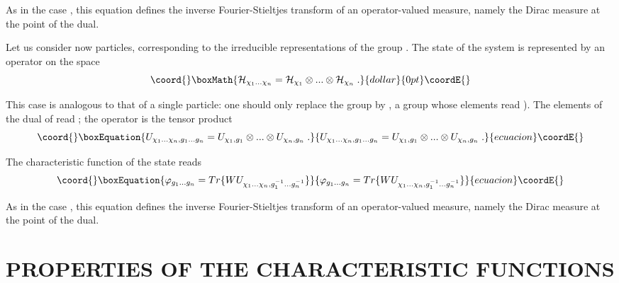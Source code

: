 \documentclass[a4paper,11pt]{article}
\begin{document}
As in the case \coordHE{}, this equation defines the inverse Fourier-Stieltjes transform of an 
operator-valued measure, namely the Dirac measure \coordHE{} at the point \coordHE{} of the dual. 

Let us consider now \coordHE{} particles, corresponding to the irreducible representations 
\coordHE{} 
of the group \coordHE{}. The state of the system is represented by an operator \coordHE{} on the space
$$\coord{}\boxMath{
   \Hc_{\chi_1 ... \chi_n} = \Hc_{\chi_1}\otimes ... \otimes \Hc_{\chi_n} \; .
}{dollar}{0pt}\coordE{}$$ 

This case is analogous to that of a single particle: one should only replace the group \coordHE{} by 
\coordHE{}, 
a group whose elements read \coordHE{}). The elements of the dual of \coordHE{} read 
\coordHE{}; the operator \coordHE{} is the tensor 
product
\begin{equation}\coord{}\boxEquation{
 \label{eq.4.3}
   U_{\chi_1 ... \chi_n,g_1 ... g_n} = U_{\chi_1,g_1} \otimes ... \otimes U_{\chi_n,g_n}  \; .
}{
 U_{\chi_1 ... \chi_n,g_1 ... g_n} = U_{\chi_1,g_1} \otimes ... \otimes U_{\chi_n,g_n}  \; .
}{ecuacion}\coordE{}\end{equation}

The characteristic function of the state \coordHE{} reads
\begin{equation}\coord{}\boxEquation{
 \label{eq.4.4}
    \varphi_{g_1 ... g_n} = Tr \{ W  U_{\chi_1 ... \chi_n,g_1^{-1} ... g_n^{-1}} \}
}{
 \varphi_{g_1 ... g_n} = Tr \{ W  U_{\chi_1 ... \chi_n,g_1^{-1} ... g_n^{-1}} \}
}{ecuacion}\coordE{}\end{equation}

As in the case \coordHE{}, this equation defines the inverse Fourier-Stieltjes transform of an 
operator-valued measure, namely the Dirac measure \coordHE{} at the point \coordHE{} of 
the dual.

\section{PROPERTIES OF THE CHARACTERISTIC FUNCTIONS}
\end{document}
